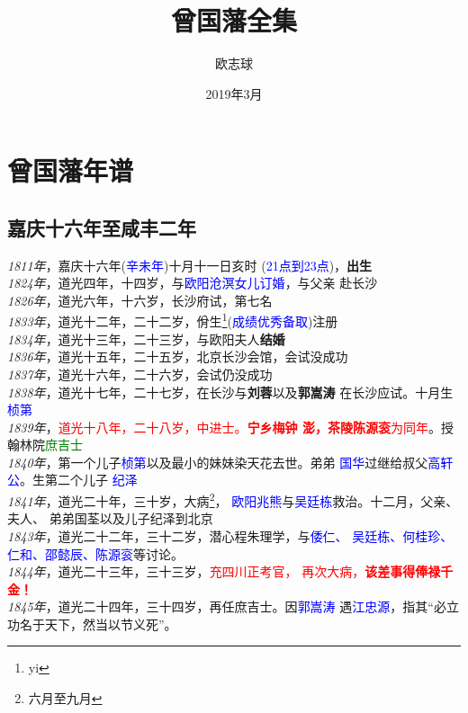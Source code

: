 \documentclass[11pt,a4paper,UTF8]{ctexbook}
\title{曾国藩全集}
\author{欧志球}
\date{2019年3月}
\numberwithin{equation}{chapter}
\begin{document}
	\maketitle
  \chapter{曾国藩年谱}
  \section{嘉庆十六年至咸丰二年}
  \emph{1811年}，嘉庆十六年(\textcolor{blue}{辛未年})十月十一日亥时
  (\textcolor{blue}{21点到23点})，\textbf{出生} \\
   \emph{1824年}，道光四年，十四岁，与\textcolor{blue}{欧阳沧溟女儿订婚}，与父亲
   赴长沙 \\
   \emph{1826年}，道光六年，十六岁，长沙府试，第七名 \\
   \emph{1833年}，道光十二年，二十二岁，佾生\footnote{yi}(\textcolor{blue}{成绩优秀备取})注册 \\
   \emph{1834年}，道光十三年，二十三岁，与欧阳夫人\textbf{结婚} \\
   \emph{1836年}，道光十五年，二十五岁，北京长沙会馆，会试没成功 \\
   \emph{1837年}，道光十六年，二十六岁，会试仍没成功 \\
   \emph{1838年}，道光十七年，二十七岁，在长沙与\textbf{刘蓉}以及\textbf{郭嵩涛}
   在长沙应试。十月生\textcolor{blue}{桢第} \\
   \emph{1839年}，\textcolor{red}{道光十八年，二十八岁，中进士。\textbf{宁乡梅钟
       澎，茶陵陈源衮}为同年}。授翰林院\textcolor{green}{庶吉士} \\
   \emph{1840年}，第一个儿子\textcolor{blue}{桢第}以及最小的妹妹染天花去世。弟弟
   \textcolor{blue}{国华}过继给叔父\textcolor{blue}{高轩公}。生第二个儿子
   \textcolor{blue}{纪泽} \\
   \emph{1841年}，道光二十年，三十岁，大病\footnote{六月至九月}，
   \textcolor{blue}{欧阳兆熊}与\textcolor{blue}{吴廷栋}救治。十二月，父亲、夫人、
   弟弟国荃以及儿子纪泽到北京 \\
   \emph{1843年}，道光二十二年，三十二岁，潜心程朱理学，与\textcolor{blue}{倭仁、
     吴廷栋、何桂珍、仁和、邵懿辰、陈源衮}等讨论。 \\
   \emph{1844年}，道光二十三年，三十三岁，\textcolor{red}{充四川正考官，
     再次大病，\textbf{该差事得俸禄千金！}} \\
   \emph{1845年}，道光二十四年，三十四岁，再任庶吉士。因\textcolor{blue}{郭嵩涛}
   遇\textcolor{blue}{江忠源}，指其“必立功名于天下，然当以节义死”。 \\
\end{document}
